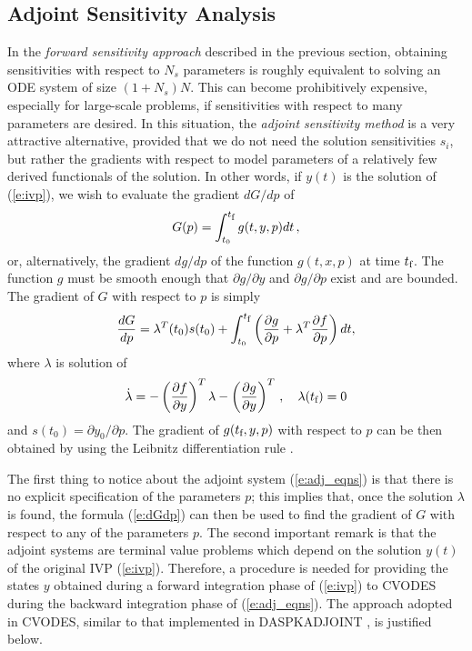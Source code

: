 
\subsection{Adjoint Sensitivity Analysis}\label{ss:adj_sensitivity}

In the {\em forward sensitivity approach} described in the previous
section, obtaining sensitivities with respect to $N_s$ parameters is roughly
equivalent to solving an ODE system of size $(1+N_s) N$. This can become 
prohibitively expensive, especially for large-scale problems, if sensitivities
with respect to many parameters are desired.
In this situation, the {\em adjoint sensitivity method} is a very
attractive alternative, provided that we do not need the solution sensitivities
$s_i$, but rather the gradients with respect to model parameters of a relatively 
few derived functionals of the solution. In other words, if $y(t)$ is the solution
of (\ref{e:ivp}), we wish to evaluate the gradient ${dG}/{dp}$ of
\begin{equation}\label{e:G}
G(p) = \int_{t_0}^{t_\mb{f}} g(t, y, p) dt \, ,
\end{equation}
or, alternatively, the gradient ${dg}/{dp}$ of the function $g(t, x, p)$ 
at time $t_\mb{f}$. 
The function $g$ must be smooth enough that $\partial g / \partial y$ 
and $\partial g / \partial p$ exist and are bounded. 
%
The gradient of $G$ with respect to $p$ is simply
\begin{equation}\label{e:dGdp}
  \frac{dG}{dp} = \lambda^T(t_0) s(t_0) + 
  \int_{t_0}^{t_\mb{f}} \left( \frac{\partial g}{\partial p} + 
    \lambda^T \frac{\partial f}{\partial p} \right) dt,
\end{equation}
where $\lambda$ is solution of
\begin{equation}\label{e:adj_eqns}
{\dot \lambda} = -\left( \dfdy \right)^T \lambda - 
\left( \frac{\partial g}{\partial y} \right)^T \, ,
\quad \lambda(t_\mb{f}) = 0
\end{equation}
and $s(t_0) = \partial y_0 / \partial p$.
%
The gradient of $g(t_\mb{f},y,p)$ with respect to $p$ can be then obtained
by using the Leibnitz differentiation rule \cite{CLPS:03}.

The first thing to notice about the adjoint system (\ref{e:adj_eqns}) is that there is 
no explicit specification of the parameters $p$; this implies that, once the solution
$\lambda$ is found, the formula (\ref{e:dGdp}) can then be used to find the gradient
of $G$ with respect to any of the parameters $p$. 
The second important remark is that the adjoint systems are terminal value problems 
which depend on the solution $y(t)$ of the original IVP (\ref{e:ivp}). 
Therefore, a procedure is needed for providing the states $y$ obtained during a forward 
integration phase of (\ref{e:ivp}) to CVODES during the backward integration phase 
of (\ref{e:adj_eqns}).
The approach adopted in CVODES, similar to that implemented
in DASPKADJOINT \cite{LiPe:00}, is justified below.


